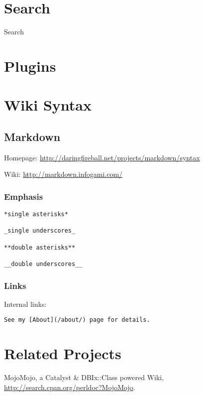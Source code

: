 \section{Search}

\begin{frame}{Search}
\end{frame}

\section{Plugins}

\section{Wiki Syntax}
\subsection{Markdown}
Homepage: \url{http://daringfireball.net/projects/markdown/syntax}

Wiki: \url{http://markdown.infogami.com/}

\subsubsection{Emphasis}

\begin{verbatim}
*single asterisks*

_single underscores_

**double asterisks**

__double underscores__
\end{verbatim}

\subsubsection{Links}
Internal links:

\begin{verbatim}
See my [About](/about/) page for details.
\end{verbatim}

\section{Related Projects}
MojoMojo, a Catalyst \& DBIx::Class powered Wiki,
\url{http://search.cpan.org/perldoc?MojoMojo}.


    
